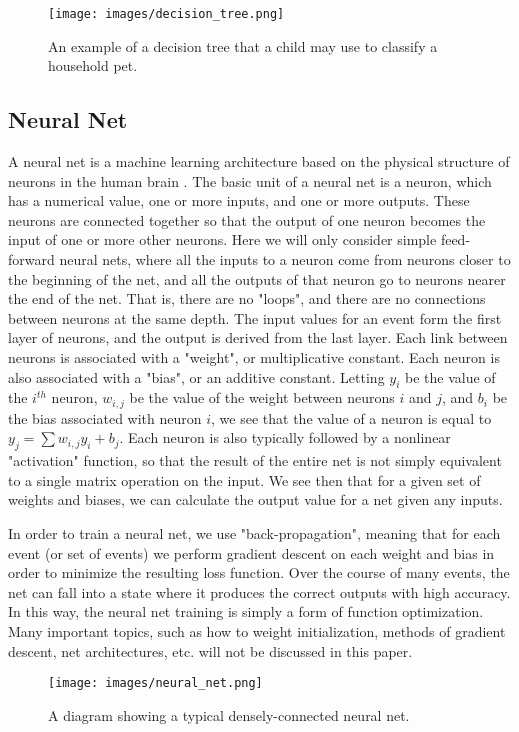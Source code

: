 \begin{figure}[t]
    \centering
    \texttt{[image: images/decision\_tree.png]}
    \caption{An example of a decision tree that a child may use to classify a household pet.}
    \label{decision_tree}
\end{figure}

\subsection*{Neural Net}

A neural net is a machine learning architecture based on the physical structure of neurons in the human brain \cite{neural_net}. The basic unit of a neural net is a neuron, which has a numerical value, one or more inputs, and one or more outputs. These neurons are connected together so that the output of one neuron becomes the input of one or more other neurons. Here we will only consider simple feed-forward neural nets, where all the inputs to a neuron come from neurons closer to the beginning of the net, and all the outputs of that neuron go to neurons nearer the end of the net. That is, there are no "loops", and there are no connections between neurons at the same depth. The input values for an event form the first layer of neurons, and the output is derived from the last layer. Each link between neurons is associated with a "weight", or multiplicative constant. Each neuron is also associated with a "bias", or an additive constant. Letting $y_i$ be the value of the $i^{th}$ neuron, $w_{i,j}$ be the value of the weight between neurons $i$ and $j$, and $b_i$ be the bias associated with neuron $i$, we see that the value of a neuron is equal to $y_j = \sum{w_{i,j}y_i} + b_j$. Each neuron is also typically followed by a nonlinear "activation" function, so that the result of the entire net is not simply equivalent to a single matrix operation on the input. We see then that for a given set of weights and biases, we can calculate the output value for a net given any inputs.

In order to train a neural net, we use "back-propagation", meaning that for each event (or set of events) we perform gradient descent on each weight and bias in order to minimize the resulting loss function. Over the course of many events, the net can fall into a state where it produces the correct outputs with high accuracy. In this way, the neural net training is simply a form of function optimization. Many important topics, such as how to weight initialization, methods of gradient descent, net architectures, etc. will not be discussed in this paper.

\begin{figure}[t]
    \centering
    \texttt{[image: images/neural\_net.png]}
    \caption{A diagram showing a typical densely-connected neural net.}
    \label{neural_net}
\end{figure}